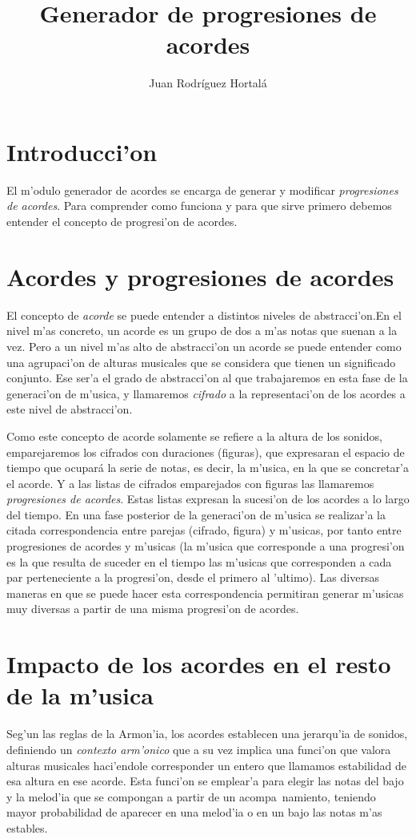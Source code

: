 \documentclass[a4paper,12pt]{article}
\author{Juan Rodr\'iguez Hortal\'a}
\title{Generador de progresiones de acordes}
\begin{document}
\maketitle
\tableofcontents
\section{Introducci'on}
El m'odulo generador de acordes se encarga de generar y modificar \emph{progresiones de acordes}. Para comprender como funciona y para que sirve primero debemos entender el concepto de progresi'on de acordes.

\section {Acordes y progresiones de acordes} El concepto de \emph{acorde} se puede entender a distintos niveles de abstracci'on.En el nivel m'as concreto, un acorde es un grupo de dos a m'as notas que suenan a la vez. Pero a un nivel m'as alto de abstracci'on un acorde se puede entender como una agrupaci'on de alturas musicales que se considera que tienen un significado conjunto. Ese ser'a el grado de abstracci'on al que trabajaremos en esta fase de la generaci'on de m'usica, y llamaremos \emph{cifrado} a la representaci'on de los acordes a este nivel de abstracci'on. 

Como este concepto de acorde solamente se refiere a la altura de los sonidos, emparejaremos los cifrados con duraciones (figuras), que expresaran el espacio de tiempo que ocupará la serie de notas, es decir, la m'usica, en la que se concretar'a el acorde. Y a las listas de cifrados emparejados con figuras las llamaremos \emph{progresiones de acordes}. Estas listas expresan la sucesi'on de los acordes a lo largo del tiempo. En una fase posterior de la generaci'on de m'usica se realizar'a la citada correspondencia entre parejas (cifrado, figura) y m'usicas, por tanto entre progresiones de acordes y m'usicas (la m'usica que corresponde a una progresi'on es la que resulta de suceder en el tiempo las m'usicas que corresponden a cada par perteneciente a la progresi'on, desde el primero al 'ultimo). Las diversas maneras en que se puede hacer esta correspondencia permitiran generar m'usicas muy diversas a partir de una misma progresi'on de acordes.

\section {Impacto de los acordes en el resto de la m'usica}
Seg'un las reglas de la Armon'ia, los acordes establecen una jerarqu'ia de sonidos, definiendo un \emph{contexto arm'onico} que a su vez implica una funci'on que valora alturas musicales haci'endole corresponder un entero que llamamos estabilidad de esa altura en ese acorde. Esta funci'on se emplear'a para elegir las notas del bajo y la melod'ia que se compongan a partir de un acompa~namiento, teniendo mayor probabilidad de aparecer en una melod'ia o en un bajo las notas m'as estables.
\end{document}
